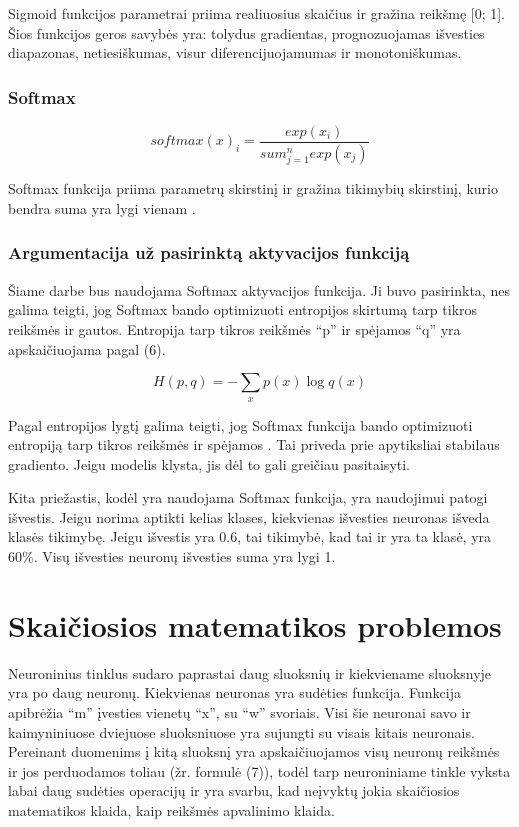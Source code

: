 \documentclass{VUMIFInfKursinis}
\begin{document}
\par
Sigmoid funkcijos parametrai priima realiuosius skaičius ir gražina reikšmę [0; 1].
Šios funkcijos geros savybės yra: tolydus gradientas, prognozuojamas išvesties
diapazonas, netiesiškumas, visur diferencijuojamumas ir monotoniškumas. \cite{salt16}

\subsubsection{Softmax}
\begin{equation}
  softmax(x)_i = \frac{exp(x_i)}{sum_{j=1}^{n}exp(x_j)}
\end{equation}

\par
Softmax funkcija priima parametrų skirstinį ir gražina tikimybių skirstinį,
kurio bendra suma yra lygi vienam \cite{salt16}.

\subsubsection{Argumentacija už pasirinktą aktyvacijos funkciją}
\par
Šiame darbe bus naudojama Softmax aktyvacijos funkcija. Ji buvo
pasirinkta, nes galima teigti, jog Softmax bando optimizuoti entropijos
skirtumą tarp tikros reikšmės ir gautos. Entropija tarp tikros reikšmės
\enquote{p} ir spėjamos \enquote{q} yra apskaičiuojama pagal (6).

\begin{equation}
H(p, q) = - \sum_{x}p(x) \log q(x)
\end{equation}

\par
Pagal entropijos lygtį galima teigti, jog Softmax funkcija
bando optimizuoti entropiją tarp tikros reikšmės ir spėjamos \cite{salt6}.
Tai priveda prie apytiksliai stabilaus gradiento. Jeigu modelis klysta,
jis dėl to gali greičiau pasitaisyti.
\par
Kita priežastis, kodėl yra naudojama Softmax funkcija, yra naudojimui
patogi išvestis. Jeigu norima aptikti kelias klases, kiekvienas išvesties
neuronas išveda klasės tikimybę. Jeigu išvestis yra 0.6, tai tikimybė, kad tai ir
yra ta klasė, yra 60\%. Visų išvesties neuronų išvesties suma yra lygi 1.

\section{Skaičiosios matematikos problemos}
\par
Neuroninius tinklus sudaro paprastai daug sluoksnių ir kiekviename sluoksnyje yra po
daug neuronų. Kiekvienas neuronas yra sudėties funkcija. Funkcija apibrėžia \enquote{m} įvesties
vienetų \enquote{x}, su \enquote{w} svoriais. Visi šie neuronai savo ir kaimyniniuose dviejuose sluoksniuose
yra sujungti su visais kitais neuronais. Pereinant duomenims į kitą sluoksnį yra apskaičiuojamos
visų neuronų reikšmės ir jos perduodamos toliau (žr. formulė (7)), todėl tarp neuroniniame tinkle vyksta
labai daug sudėties operacijų ir yra svarbu, kad neįvyktų jokia skaičiosios matematikos klaida,
kaip reikšmės apvalinimo klaida.
\end{document}
